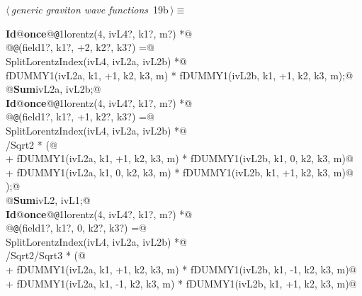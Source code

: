 \documentclass[a4paper,12pt]{amsart}
\renewcommand{\NWtarget}[2]{\hypertarget{#1}{#2}}
\begin{document}
\begin{flushleft} \small\label{scrap40}\raggedright\small
\NWtarget{nuweb19b}{} $\langle\,${\itshape generic graviton wave functions}\nobreak\ {\footnotesize {19b}}$\,\rangle\equiv$
\vspace{-1ex}
\begin{list}{}{} \item
\mbox{}\verb@@\hbox{\sffamily\bfseries Id}\verb@ @\hbox{\sffamily\bfseries once}\verb@ @{\tt @}\verb@1lorentz(4, ivL4?, k1?, m?) *@\\
\mbox{}\verb@      @{\tt @}(field1?, k1?, +2, k2?, k3?) =@\\
\mbox{}\verb@   SplitLorentzIndex(ivL4, ivL2a, ivL2b) *@\\
\mbox{}\verb@   fDUMMY1(ivL2a, k1, +1, k2, k3, m) * fDUMMY1(ivL2b, k1, +1, k2, k3, m);@\\
\mbox{}\verb@   @\hbox{\sffamily\bfseries Sum}\verb@ ivL2a, ivL2b;@\\
\mbox{}\verb@@\hbox{\sffamily\bfseries Id}\verb@ @\hbox{\sffamily\bfseries once}\verb@ @{\tt @}\verb@1lorentz(4, ivL4?, k1?, m?) *@\\
\mbox{}\verb@      @{\tt @}(field1?, k1?, +1, k2?, k3?) =@\\
\mbox{}\verb@   SplitLorentzIndex(ivL4, ivL2a, ivL2b) *@\\
\mbox{}/Sqrt2 * (@\\
\mbox{}\verb@      + fDUMMY1(ivL2a, k1, +1, k2, k3, m) * fDUMMY1(ivL2b, k1,  0, k2, k3, m)@\\
\mbox{}\verb@      + fDUMMY1(ivL2a, k1,  0, k2, k3, m) * fDUMMY1(ivL2b, k1, +1, k2, k3, m)@\\
\mbox{}\verb@   );@\\
\mbox{}\verb@   @\hbox{\sffamily\bfseries Sum}\verb@ ivL2, ivL1;@\\
\mbox{}\verb@@\hbox{\sffamily\bfseries Id}\verb@ @\hbox{\sffamily\bfseries once}\verb@ @{\tt @}\verb@1lorentz(4, ivL4?, k1?, m?) *@\\
\mbox{}\verb@      @{\tt @}(field1?, k1?,  0, k2?, k3?) =@\\
\mbox{}\verb@   SplitLorentzIndex(ivL4, ivL2a, ivL2b) *@\\
\mbox{}/Sqrt2/Sqrt3 * (@\\
\mbox{}\verb@      + fDUMMY1(ivL2a, k1, +1, k2, k3, m) * fDUMMY1(ivL2b, k1, -1, k2, k3, m)@\\
\mbox{}\verb@      + fDUMMY1(ivL2a, k1, -1, k2, k3, m) * fDUMMY1(ivL2b, k1, +1, k2, k3, m)@\\

\end{list}
\end{flushleft}
\end{document}
